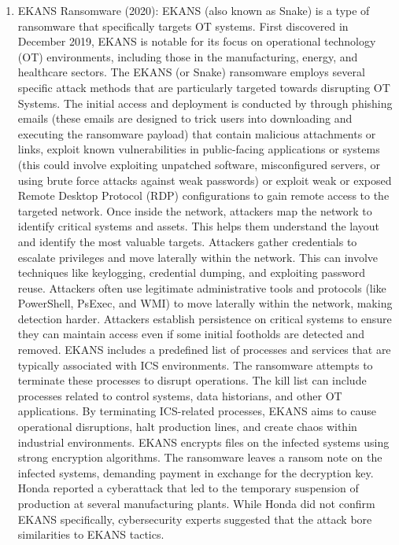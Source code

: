 \begin{enumerate}
    \item EKANS Ransomware (2020): EKANS (also known as Snake) is a type of ransomware that specifically targets OT systems. First discovered in December 2019, EKANS is notable for its focus on operational technology (OT) environments, including those in the manufacturing, energy, and healthcare sectors. The EKANS (or Snake) ransomware employs several specific attack methods that are particularly targeted towards disrupting OT Systems. The initial access and deployment is conducted by through phishing emails (these emails are designed to trick users into downloading and executing the ransomware payload) that contain malicious attachments or links, exploit known vulnerabilities in public-facing applications or systems (this could involve exploiting unpatched software, misconfigured servers, or using brute force attacks against weak passwords) or  exploit weak or exposed Remote Desktop Protocol (RDP) configurations to gain remote access to the targeted network. Once inside the network, attackers map the network to identify critical systems and assets. This helps them understand the layout and identify the most valuable targets. Attackers gather credentials to escalate privileges and move laterally within the network. This can involve techniques like keylogging, credential dumping, and exploiting password reuse. Attackers often use legitimate administrative tools and protocols (like PowerShell, PsExec, and WMI) to move laterally within the network, making detection harder. Attackers establish persistence on critical systems to ensure they can maintain access even if some initial footholds are detected and removed. EKANS includes a predefined list of processes and services that are typically associated with ICS environments. The ransomware attempts to terminate these processes to disrupt operations. The kill list can include processes related to control systems, data historians, and other OT applications. By terminating ICS-related processes, EKANS aims to cause operational disruptions, halt production lines, and create chaos within industrial environments. EKANS encrypts files on the infected systems using strong encryption algorithms. The ransomware leaves a ransom note on the infected systems, demanding payment in exchange for the decryption key. Honda reported a cyberattack that led to the temporary suspension of production at several manufacturing plants. While Honda did not confirm EKANS specifically, cybersecurity experts suggested that the attack bore similarities to EKANS tactics.
 







\end{enumerate}
